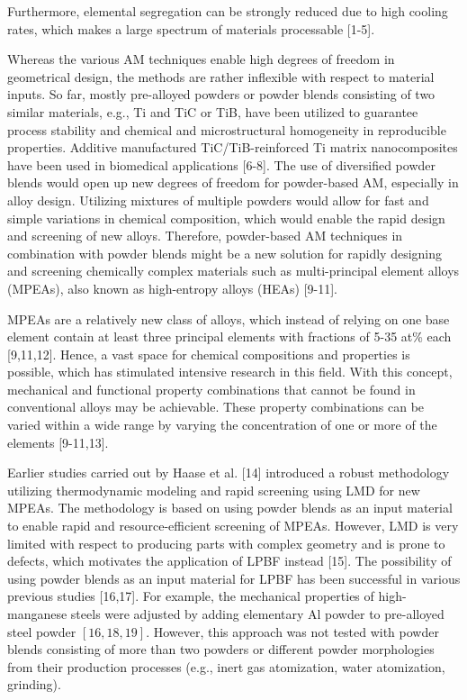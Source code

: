 \documentclass[10pt]{article}
\begin{document}
Furthermore, elemental segregation can be strongly reduced due to high cooling rates, which makes a large spectrum of materials processable [1-5].

Whereas the various AM techniques enable high degrees of freedom in geometrical design, the methods are rather inflexible with respect to material inputs. So far, mostly pre-alloyed powders or powder blends consisting of two similar materials, e.g., Ti and TiC or TiB, have been utilized to guarantee process stability and chemical and microstructural homogeneity in reproducible properties. Additive manufactured TiC/TiB-reinforced Ti matrix nanocomposites have been used in biomedical applications [6-8]. The use of diversified powder blends would open up new degrees of freedom for powder-based AM, especially in alloy design. Utilizing mixtures of multiple powders would allow for fast and simple variations in chemical composition, which would enable the rapid design and screening of new alloys. Therefore, powder-based AM techniques in combination with powder blends might be a new solution for rapidly designing and screening chemically complex materials such as multi-principal element alloys (MPEAs), also known as high-entropy alloys (HEAs) [9-11].

MPEAs are a relatively new class of alloys, which instead of relying on one base element contain at least three principal elements with fractions of 5-35 at\% each [9,11,12]. Hence, a vast space for chemical compositions and properties is possible, which has stimulated intensive research in this field. With this concept, mechanical and functional property combinations that cannot be found in conventional alloys may be achievable. These property combinations can be varied within a wide range by varying the concentration of one or more of the elements [9-11,13].

Earlier studies carried out by Haase et al. [14] introduced a robust methodology utilizing thermodynamic modeling and rapid screening using LMD for new MPEAs. The methodology is based on using powder blends as an input material to enable rapid and resource-efficient screening of MPEAs. However, LMD is very limited with respect to producing parts with complex geometry and is prone to defects, which motivates the application of LPBF instead [15]. The possibility of using powder blends as an input material for LPBF has been successful in various previous studies [16,17]. For example, the mechanical properties of high-manganese steels were adjusted by adding elementary $\mathrm{Al}$ powder to pre-alloyed steel powder $[16,18,19]$. However, this approach was not tested with powder blends consisting of more than two powders or different powder morphologies from their production processes (e.g., inert gas atomization, water atomization, grinding).
\end{document}
